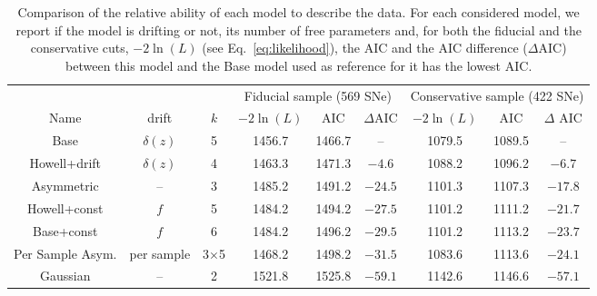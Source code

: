 \documentclass[]{aa} %
\begin{document}
\begin{table}
    \centering
    \caption{Comparison of the relative ability of each model to describe the
        data. For each considered model, we report if the model is drifting or
        not, its number of free parameters and, for both the fiducial and the
        conservative cuts, $-2\ln(L)$ (see Eq.~\ref{eq:likelihood}), the AIC and
        the AIC difference ($\Delta$AIC) between this model and the Base model
        used as reference for it has the lowest AIC.}
    \label{tab:comp}
    \begin{tabular}{ccc|ccc|ccc}
        \hline\hline
        & & & \multicolumn{3}{c}{Fiducial sample (569 SNe)}
            & \multicolumn{3}{|c}{Conservative sample (422 SNe)} \\
        Name & drift & $k$ &
        $-2\ln(L)$ & AIC & $\Delta$AIC & $-2\ln(L)$ & AIC & $\Delta$ AIC\\
        \hline

        Base & $\delta(z)$ & 5
        & 1456.7 & 1466.7 & -- 
        & 1079.5 & 1089.5 & -- \\

        Howell+drift & $\delta(z)$ & 4
        & 1463.3 & 1471.3 & $-4.6$
        & 1088.2 & 1096.2 & $-6.7$ 
        \\

        Asymmetric & -- & 3
        & 1485.2 & 1491.2 & $-24.5$
        & 1101.3 & 1107.3 & $-17.8$ 
        \\

        Howell+const & $f$ & 5
        & 1484.2 & 1494.2 & $-27.5$
        & 1101.2 & 1111.2 & $-21.7$ 
        \\

        Base+const & $f$ & 6
        & 1484.2 & 1496.2 & $-29.5$
        & 1101.2 & 1113.2 & $-23.7$ 
        \\

        Per Sample Asym. & per sample & 3$\times$5
        & 1468.2 & 1498.2 & $-31.5$
        & 1083.6 & 1113.6 & $-24.1$ 
        \\

        Gaussian & -- & 2
        & 1521.8 & 1525.8 & $-59.1$
        & 1142.6 & 1146.6 & $-57.1$ 
        \\
        \hline
    \end{tabular}
\end{table}
\end{document}
